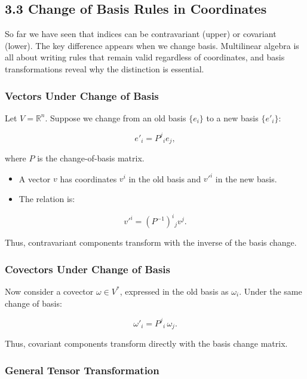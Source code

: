 \documentclass[
  letterpaper,
  DIV=11,
  numbers=noendperiod]{scrreprt}
\providecommand{\tightlist}{%
  \setlength{\itemsep}{0pt}\setlength{\parskip}{0pt}}
\begin{document}
\subsection{3.3 Change of Basis Rules in
Coordinates}\label{change-of-basis-rules-in-coordinates}

So far we have seen that indices can be contravariant (upper) or
covariant (lower). The key difference appears when we change basis.
Multilinear algebra is all about writing rules that remain valid
regardless of coordinates, and basis transformations reveal why the
distinction is essential.

\subsubsection{Vectors Under Change of
Basis}\label{vectors-under-change-of-basis}

Let \(V = \mathbb{R}^n\). Suppose we change from an old basis
\(\{e_i\}\) to a new basis \(\{e'_i\}\):

\[
e'_i = P^j{}_i e_j,
\]

where \(P\) is the change-of-basis matrix.

\begin{itemize}
\tightlist
\item
  A vector \(v\) has coordinates \(v^i\) in the old basis and \(v'^i\)
  in the new basis.
\item
  The relation is:
\end{itemize}

\[
v'^i = (P^{-1})^i{}_j v^j.
\]

Thus, contravariant components transform with the inverse of the basis
change.

\subsubsection{Covectors Under Change of
Basis}\label{covectors-under-change-of-basis}

Now consider a covector \(\omega \in V^*\), expressed in the old basis
as \(\omega_i\). Under the same change of basis:

\[
\omega'_i = P^j{}_i \, \omega_j.
\]

Thus, covariant components transform directly with the basis change
matrix.

\subsubsection{General Tensor
Transformation}\label{general-tensor-transformation}
\end{document}

